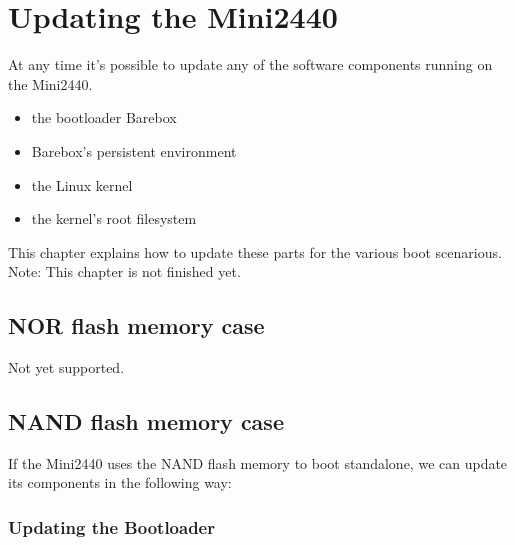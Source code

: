 %
%
%
%
%
%
%

\chapter{Updating the Mini2440}	\label{sec:updating}

At any time it's possible to update any of the software components
running on the Mini2440.

\begin{itemize}
	\item the bootloader Barebox
	\item Barebox's persistent environment
	\item the Linux kernel
	\item the kernel's root filesystem
\end{itemize}

This chapter explains how to update these parts for the various boot scenarious.
Note: This chapter is not finished yet.

\section{NOR flash memory case}

Not yet supported.

\section{NAND flash memory case}

If the Mini2440 uses the NAND flash memory to boot standalone, we can update
its components in the following way:

\subsection{Updating the Bootloader}

